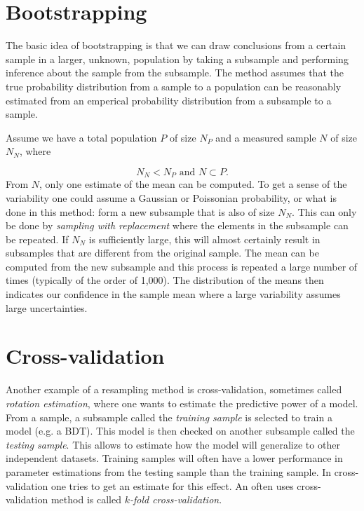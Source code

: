 \begin{appendices}
\section{Bootstrapping}
The basic idea of bootstrapping is that we can draw conclusions from a certain sample in a larger, unknown, population by taking a subsample and performing inference about the sample from the subsample. The method assumes that the true probability distribution from a sample to a population can be reasonably estimated from an emperical probability distribution from a subsample to a sample.

Assume we have a total population $P$ of size $N_P$ and a measured sample $N$ of size $N_N$, where 

\begin{equation}
N_N < N_P \textrm{ and } N \subset P.
\end{equation}
From $N$, only one estimate of the mean can be computed. To get a sense of the variability one could assume a Gaussian or Poissonian probability, or what is done in this method: form a new subsample that is also of size $N_N$. This can only be done by \textit{sampling with replacement} where the elements in the subsample can be repeated. If $N_N$ is sufficiently large, this will almost certainly result in subsamples that are different from the original sample. The mean can be computed from the new subsample and this process is repeated a large number of times (typically of the order of 1,000). The distribution of the means then indicates our confidence in the sample mean where a large variability assumes large uncertainties.

\section{Cross-validation}
Another example of a resampling method is cross-validation, sometimes called \textit{rotation estimation}, where one wants to estimate the predictive power of a model. From a sample, a subsample called the \textit{training sample} is selected to train a model (e.g. a BDT). This model is then checked on another subsample called the \textit{testing sample}. This allows to estimate how the model will generalize to other independent datasets. Training samples will often have a lower performance in parameter estimations from the testing sample than the training sample. In cross-validation one tries to get an estimate for this effect. An often uses cross-validation method is called \textit{$k$-fold cross-validation}.


\end{appendices}
